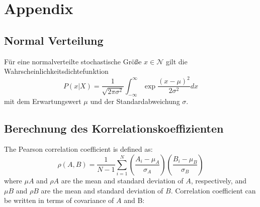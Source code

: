 \section*{Appendix}

\subsection*{Normal Verteilung}

Für eine normalverteilte stochastische Größe $x \in \mathcal{N}$ gilt die Wahrscheinlichkeitsdichtefunktion
\begin{equation}
    P(x|X) = \frac{1}{\sqrt{2\pi\sigma^2}} \int_{-\infty}^{\infty} \exp{\frac{(x-\mu)^2}{2\sigma^2}} dx
\end{equation}
mit dem Erwartungswert $\mu$ und der Standardabweichung $\sigma$.

\subsection*{Berechnung des Korrelationskoeffizienten}
The Pearson correlation coefficient is defined as:
\begin{equation}
    \rho(A, B)=\frac{1}{N-1} \sum_{i=1}^{N}\left(\frac{A_{i}-\mu_{A}}{\sigma_{A}}\right)\left(\frac{B_{i}-\mu_{B}}{\sigma_{B}}\right)
\end{equation}
where $\mu A$ and $\rho A$ are the mean and standard deviation of $A$, respectively, and $\mu B$ and $\rho B$ are the mean and standard deviation of $B$. Correlation coefficient can be written in terms of covariance of $A$ and B: